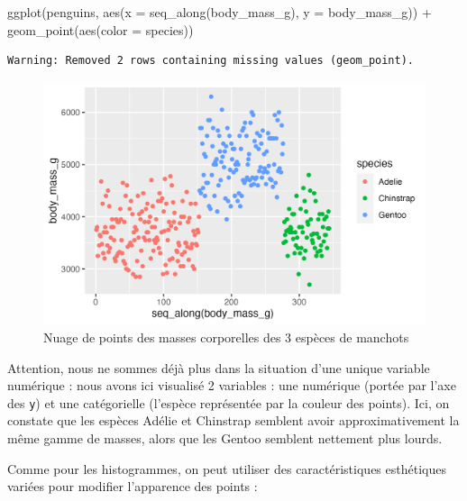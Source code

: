 \documentclass[
  letterpaper,
  DIV=11,
  numbers=noendperiod]{scrreprt}
\newenvironment{Shaded}{\begin{snugshade}}{\end{snugshade}}
\newcommand{\AttributeTok}[1]{\textcolor[rgb]{0.40,0.45,0.13}{#1}}
\newcommand{\FunctionTok}[1]{\textcolor[rgb]{0.28,0.35,0.67}{#1}}
\newcommand{\NormalTok}[1]{\textcolor[rgb]{0.00,0.23,0.31}{#1}}
\newcommand{\SpecialCharTok}[1]{\textcolor[rgb]{0.37,0.37,0.37}{#1}}
\begin{document}
\begin{Shaded}
\begin{Highlighting}[]
\FunctionTok{ggplot}\NormalTok{(penguins, }\FunctionTok{aes}\NormalTok{(}\AttributeTok{x =} \FunctionTok{seq\_along}\NormalTok{(body\_mass\_g), }\AttributeTok{y =}\NormalTok{ body\_mass\_g)) }\SpecialCharTok{+}
  \FunctionTok{geom\_point}\NormalTok{(}\FunctionTok{aes}\NormalTok{(}\AttributeTok{color =}\NormalTok{ species))}
\end{Highlighting}
\end{Shaded}

\begin{verbatim}
Warning: Removed 2 rows containing missing values (geom_point).
\end{verbatim}

\begin{figure}[H]

{\centering \includegraphics{./03-visualization_files/figure-pdf/fig-cloud-1.png}

}

\caption{\label{fig-cloud}Nuage de points des masses corporelles des 3
espèces de manchots}

\end{figure}

Attention, nous ne sommes déjà plus dans la situation d'une unique
variable numérique : nous avons ici visualisé 2 variables : une
numérique (portée par l'axe des \texttt{y}) et une catégorielle
(l'espèce représentée par la couleur des points). Ici, on constate que
les espèces Adélie et Chinstrap semblent avoir approximativement la même
gamme de masses, alors que les Gentoo semblent nettement plus lourds.

Comme pour les histogrammes, on peut utiliser des caractéristiques
esthétiques variées pour modifier l'apparence des points :
\end{document}
